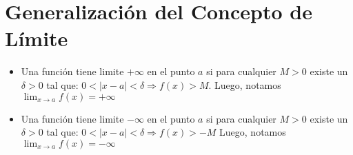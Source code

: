 \documentclass[11pt,a4paper]{article}
\begin{document}
\section{Generalizaci\'on del Concepto de L\'imite}
\begin{itemize}
\item Una funci\'on tiene limite $+\infty$ en el punto $a$ si para cualquier $M>0$ existe un $\delta>0$ tal que: $0<|x-a|<\delta \Rightarrow f(x)>M$. Luego, notamos $\displaystyle{\lim_{x \to a} f(x) = +\infty}$
\item Una funci\'on tiene limite $-\infty$ en el punto $a$ si para cualquier $M>0$ existe un $\delta>0$ tal que: $0<|x-a|<\delta \Rightarrow f(x)>-M$ Luego, notamos $\displaystyle{\lim_{x \to a} f(x) = -\infty}$
\end{itemize}
\end{document}
